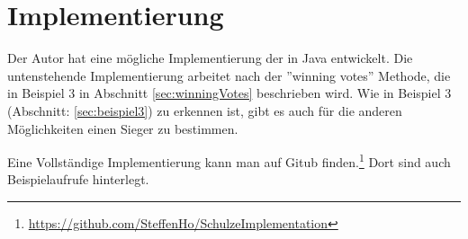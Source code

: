 \section{Implementierung}
\label{sec:implementierung}

Der Autor hat eine mögliche Implementierung der \schulze in Java entwickelt. Die untenstehende Implementierung arbeitet nach der ''winning votes'' Methode, die in Beispiel 3 in Abschnitt \ref{sec:winningVotes} beschrieben wird. Wie in Beispiel 3 (Abschnitt: \ref{sec:beispiel3}) zu erkennen ist, gibt es auch für die anderen Möglichkeiten einen Sieger zu bestimmen.

Eine Vollständige Implementierung kann man auf Gitub finden.\footnote{\url{https://github.com/SteffenHo/SchulzeImplementation}} Dort sind auch Beispielaufrufe hinterlegt. 

